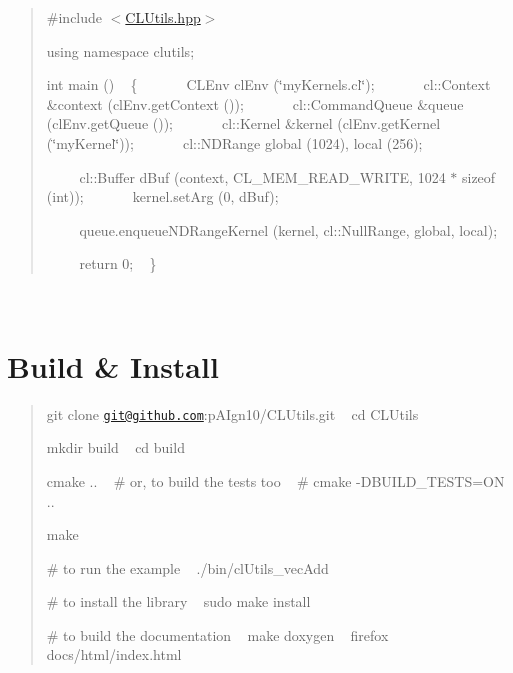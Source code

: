 \begin{quote}
\#include $<$\hyperlink{CLUtils_8hpp}{C\+L\+Utils.\+hpp}$>$

using namespace clutils;

int main () ~\newline
 \{ ~\newline
 ~~~~ C\+L\+Env cl\+Env (\char`\"{}my\+Kernels.\+cl\char`\"{}); ~\newline
 ~~~~ cl\+::\+Context \&context (cl\+Env.\+get\+Context ()); ~\newline
 ~~~~ cl\+::\+Command\+Queue \&queue (cl\+Env.\+get\+Queue ()); ~\newline
 ~~~~ cl\+::\+Kernel \&kernel (cl\+Env.\+get\+Kernel (\char`\"{}my\+Kernel\char`\"{})); ~\newline
 ~~~~ cl\+::\+N\+D\+Range global (1024), local (256); ~\newline


~~~~ cl\+::\+Buffer d\+Buf (context, C\+L\+\_\+\+M\+E\+M\+\_\+\+R\+E\+A\+D\+\_\+\+W\+R\+I\+T\+E, 1024 $\ast$ sizeof (int)); ~\newline
 ~~~~ kernel.\+set\+Arg (0, d\+Buf);

~~~~ queue.\+enqueue\+N\+D\+Range\+Kernel (kernel, cl\+::\+Null\+Range, global, local);

~~~~ return 0; ~\newline
 \} \end{quote}


~\newline
 \section*{Build \& Install }

\begin{quote}
git clone \href{mailto:git@github.com}{\tt git@github.\+com}\+:p\+A\+Ign10/\+C\+L\+Utils.\+git ~\newline
 cd C\+L\+Utils

mkdir build ~\newline
 cd build

cmake .. ~\newline
 \# or, to build the tests too ~\newline
 \# cmake -\/\+D\+B\+U\+I\+L\+D\+\_\+\+T\+E\+S\+T\+S=O\+N ..

make

\# to run the example ~\newline
 ./bin/cl\+Utils\+\_\+vec\+Add

\# to install the library ~\newline
 sudo make install

\# to build the documentation ~\newline
 make doxygen ~\newline
 firefox docs/html/index.\+html\end{quote}
